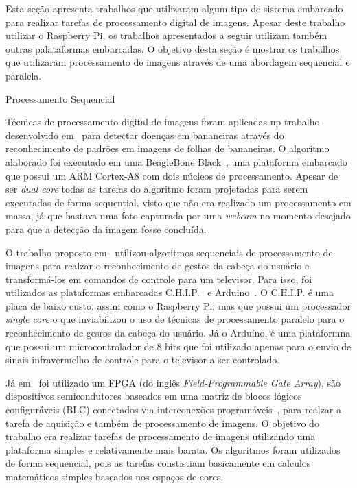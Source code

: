 Esta seção apresenta trabalhos que utilizaram algum tipo de sistema embarcado
para realizar tarefas de processamento digital de imagens. Apesar deste trabalho
utilizar o Raspberry Pi, os trabalhos apresentados a seguir utilizam também
outras palataformas embarcadas. O objetivo desta seção é mostrar os trabalhos
que utilizaram processamento de imagens através de uma abordagem sequencial e
paralela.

\begin{subsection}{Processamento Sequencial}

Técnicas de processamento digital de imagens foram aplicadas np trabalho
desenvolvido em~\cite{Karthik16} para detectar doenças em bananeiras através do
reconhecimento de padrões em imagens de folhas de bananeiras. O algoritmo
alaborado foi executado em uma BeagleBone Black~\cite{beagle}, uma plataforma
embarcado que possui um ARM Cortex-A8 com dois núcleos de processamento. Apesar
de ser \textit{dual core} todas as tarefas do algoritmo foram projetadas para
serem executadas de forma sequential, visto que não era realizado um processamento
em massa, já que bastava uma foto capturada por uma \textit{webcam} no momento 
desejado para que a detecção da imagem fosse concluída.

O trabalho proposto em~\cite{Batista17} utilizou algoritmos sequenciais de
processamento de imagens para realzar o reconhecimento de gestos da cabeça do
usuário e transformá-los em comandos de controle para um televisor. Para isso,
foi utilizados as plataformas embarcadas C.H.I.P.~\cite{chip} e
Arduino~\cite{Arduino}. O C.H.I.P. é uma placa de baixo custo, assim como o
Raspberry Pi, mas que possui um processador \textit{single core} o que
inviabilizou o uso de técnicas de processamento paralelo para o reconhecimento
de gesros da cabeça do usuário. Já o Arduíno, é uma plataformna que possui um
microcontrolador de 8 bits que foi utilizado apenas para o envio de sinais
infravermelho de controle para o televisor a ser controlado. 

Já em~\cite{Li09} foi utilizado um FPGA (do inglês \textit{Field-Programmable
Gate Array}), são dispositivos semicondutores baseados em uma matriz de blocos
lógicos configuráveis (BLC) conectados via interconexões
programáveis~\cite{fpga}, para realzar a tarefa de aquisição e também de
processamento de imagens. O objetivo do trabalho era realizar tarefas de
processamento de imagens utilizando uma plataforma simples e relativamente mais
barata. Os algoritmos foram utilizados de forma sequencial, pois as tarefas 
constistiam basicamente em calculos matemáticos simples baseados nos espaços 
de cores.  


\end{subsection}



